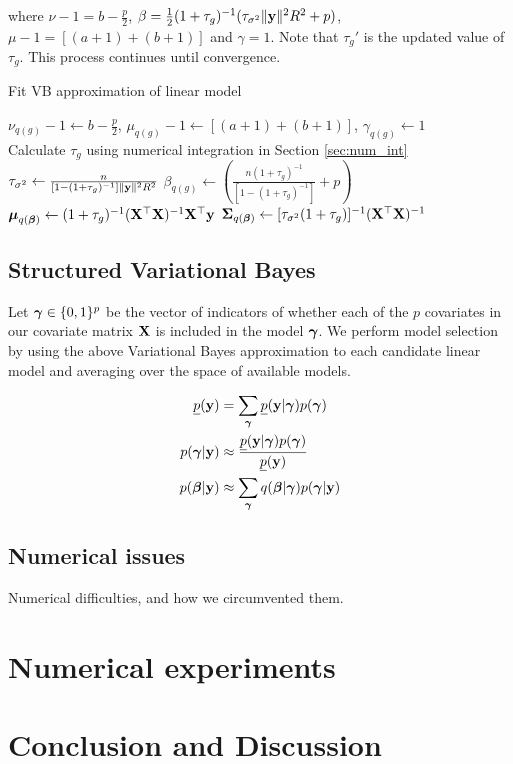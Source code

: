 \documentclass{amsart}[12pt]
\begin{document}
where $\nu - 1 = b - \frac{p}{2}$, 
$\beta = \frac{1}{2} (1 + \tau_g)^{-1} (\tau_{\sigma^2} \|{\bf y}\|^2 R^2 + p)$, 
$\mu - 1 = [(a + 1) + (b + 1)]$ and $\gamma = 1$. Note that $\tau_g'$ is the updated value of $\tau_g$. This
process continues until convergence.

\begin{algorithm}
\label{alg:algorithm_one}
\caption{Fit VB approximation of linear model}
\begin{algorithmic}
\REQUIRE $\nu_{q(g)} - 1 \leftarrow b - \frac{p}{2}$, $\mu_{q(g)} - 1 \leftarrow [(a + 1) + (b + 1)]$,
$\gamma_{q(g)} \leftarrow 1$ \\
\STATE Calculate $\tau_{g}$ using numerical integration in Section \ref{sec:num_int}
\ENDWHILE
\STATE $\tau_{\sigma^2} \leftarrow \frac{n}{[1 - (1 + \tau_g)^{-1}]\|{\bf y}\|^2 R^2}$
\STATE $\beta_{q(g)} \leftarrow \left(\frac{n (1 + \tau_g)^{-1}}{[1 - (1 + \tau_g)^{-1}]} + p \right)$
\STATE ${\boldsymbol \mu}_{q({\boldsymbol \beta})} \leftarrow (1 + \tau_g)^{-1} ({\bf X}^\top {\bf X})^{-1} {\bf X}^\top {\bf y}$
\STATE ${\boldsymbol \Sigma}_{q({\boldsymbol \beta})} \leftarrow [\tau_{\sigma^2}(1 + \tau_{g})]^{-1}({\bf X}^\top {\bf X})^{-1}$
\end{algorithmic}
\end{algorithm}

\subsection{Structured Variational Bayes}

Let ${\boldsymbol \gamma} \in \{0, 1\}^p$ be the vector of indicators of whether each of the $p$ covariates in our
covariate matrix ${\bf X}$ is included in the model ${\boldsymbol \gamma}$. We perform model selection by using the above
Variational Bayes approximation to each  candidate linear model and averaging over the space of available
models.

\begin{align*}
\underline{p}({\bf y}) &= \sum_{\boldsymbol \gamma} \underline{p}({\bf y}|{\boldsymbol \gamma}) p({\boldsymbol \gamma}) \\
p({\boldsymbol \gamma}|{\bf y}) &\approx \frac{\underline{p}({\bf y}|{\boldsymbol \gamma}) p({\boldsymbol \gamma})}{\underline{p}({\bf y})} \\
p({\boldsymbol \beta}|{\bf y}) &\approx \sum_{\boldsymbol \gamma} q({\boldsymbol \beta}|{\boldsymbol \gamma}) p({\boldsymbol \gamma}|{\bf y}) \\
\end{align*}

\subsection{Numerical issues}
Numerical difficulties, and how we circumvented them.

\section{Numerical experiments}
\label{sec:num_exp}

\section{Conclusion and Discussion}
\label{sec:conclusion}



\end{document}
